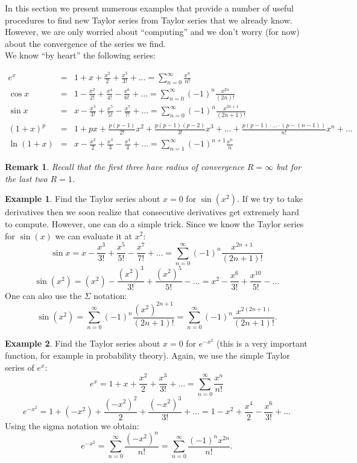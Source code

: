 \documentclass[12pt]{article}
\newtheorem{rem}{Remark}
\theoremstyle{definition}
\newtheorem{exa}{Example}
\newcommand{\sumn}{\sum_{n=1}^\infty }
\newcommand{\sumno}{\sum_{n=0}^\infty }
\begin{document}
In this section we present numerous examples that provide a number of useful procedures to find new Taylor series from Taylor series that we already know. However, we are only worried about ``computing'' and we don't worry (for now) about the convergence of the series we find. \\

We know ``by heart'' the following series:

\begin{eqnarray*}
e^x &=& 1+x+\frac{x^2}{2}+\frac{x^3}{3!}+\ldots = \sumno \frac{x^n}{n!}\\
\cos x &=& 1- \frac{x^2}{2!}  +\frac{x^4}{4!}- \frac{x^6}{6!}+\ldots = \sumno (-1)^n \frac{x^{2n}}{(2n)!}\\
\sin x &=& x- \frac{x^3}{3!}  +\frac{x^5}{5!}- \frac{x^7}{7!}+\ldots = \sumno (-1)^n \frac{x^{2n+1}}{(2n+1)!}\\
(1+x)^p &=& 1+px + \frac{p(p-1)}{2!}x^2+\frac{p(p-1)(p-2)}{3!}x^3+\ldots + \frac{p(p-1)\cdot\ldots\cdot(p-(n-1))}{n!}x^n+\ldots\\
\ln (1+x) &=& x-\frac{x^2}{2}+\frac{x^3}{3}-\frac{x^4}{4}+\ldots = \sumn (-1)^{n+1}\frac{x^n}{n}
\end{eqnarray*} 
\begin{rem}
Recall that the first three have radius of convergence $R=\infty$ but for the last two $R=1$.
\end{rem}

\begin{exa}
Find the Taylor series about $x=0$ for $\sin(x^2)$. If we try to take derivatives then we soon realize that consecutive derivatives get extremely hard to compute. However, one can do a simple trick. Since we know the Taylor series for $\sin(x)$ we can evaluate it at $x^2$:
$$\sin x = x- \frac{x^3}{3!}  +\frac{x^5}{5!}- \frac{x^7}{7!}+\ldots = \sumno (-1)^n \frac{x^{2n+1}}{(2n+1)!}$$
$$\sin(x^2) = (x^2) -\frac{(x^2)^3}{3!} + \frac{(x^2)^5}{5!} - \ldots = x^2-\frac{x^6}{3!}+\frac{x^{10}}{5!}-\ldots$$
One can also use the $\Sigma$ notation:
$$\sin(x^2)=\sumno (-1)^n \frac{(x^2)^{2n+1}}{(2n+1)!}=\sumno (-1)^n \frac{x^{2(2n+1)}}{(2n+1)!}.$$
\end{exa}

\begin{exa}
Find the Taylor series about $x=0$ for $e^{-x^2}$ (this is a very important function, for example in probability theory). Again, we use the simple Taylor series of $e^x$:
$$e^x = 1+x+\frac{x^2}{2}+\frac{x^3}{3!}+\ldots = \sumno \frac{x^n}{n!}$$
$$e^{-x^2} = 1+(-x^2)+\frac{(-x^2)^2}{2}+\frac{(-x^2)^3}{3!}+\ldots= 1-x^2+\frac{x^4}{2}-\frac{x^6}{3!}+\ldots$$
Using the sigma notation we obtain:
$$e^{-x^2} = \sumno \frac{(-x^2)^n}{n!}=\sumno \frac{(-1)^nx^{2n}}{n!}.$$
\end{exa}
\end{document}
